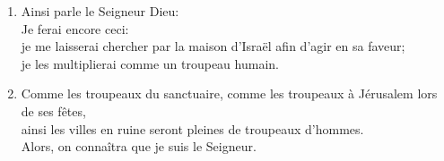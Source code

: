 \documentclass[12pt,a4paper,titlepage]{article}
\def \pslabelsep{0.2em} %
\def \psleftmargin{0em} %
\begin{document}
\begin{enumerate}[leftmargin=\psleftmargin, labelsep = \pslabelsep, label={\arabic*}, font=\color{\pscolor}\small\textsuperscript, parsep=0em, itemsep=0em, topsep=0em ]
\item  Ainsi parle le Seigneur Dieu: \\ Je ferai encore ceci: \\ je me laisserai chercher par la maison d’Israël afin d’agir en sa faveur; \\ je les multiplierai comme un troupeau humain.
\item Comme les troupeaux du sanctuaire, comme les troupeaux à Jérusalem lors de ses fêtes, \\ ainsi les villes en ruine seront pleines de troupeaux d’hommes. \\ Alors, on connaîtra que je suis le Seigneur.



\end{enumerate}
\end{document}
